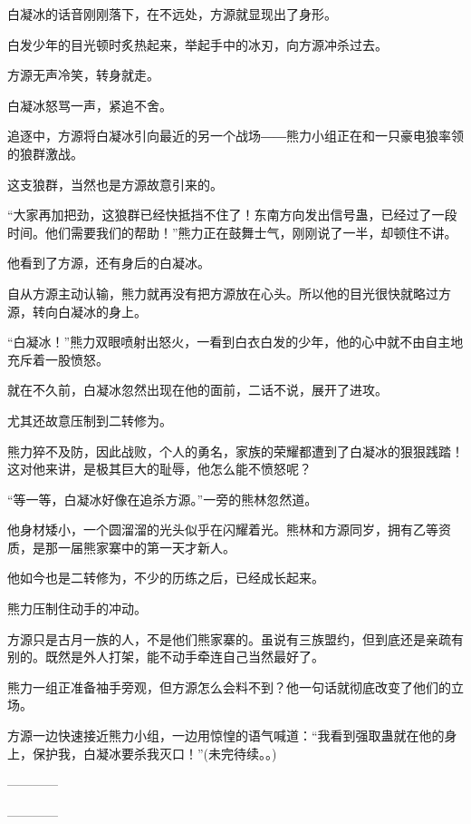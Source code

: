 \begin{this_body}
白凝冰的话音刚刚落下，在不远处，方源就显现出了身形。

白发少年的目光顿时炙热起来，举起手中的冰刃，向方源冲杀过去。

方源无声冷笑，转身就走。

白凝冰怒骂一声，紧追不舍。

追逐中，方源将白凝冰引向最近的另一个战场――熊力小组正在和一只豪电狼率领的狼群激战。

这支狼群，当然也是方源故意引来的。

“大家再加把劲，这狼群已经快抵挡不住了！东南方向发出信号蛊，已经过了一段时间。他们需要我们的帮助！”熊力正在鼓舞士气，刚刚说了一半，却顿住不讲。

他看到了方源，还有身后的白凝冰。

自从方源主动认输，熊力就再没有把方源放在心头。所以他的目光很快就略过方源，转向白凝冰的身上。

“白凝冰！”熊力双眼喷射出怒火，一看到白衣白发的少年，他的心中就不由自主地充斥着一股愤怒。

就在不久前，白凝冰忽然出现在他的面前，二话不说，展开了进攻。

尤其还故意压制到二转修为。

熊力猝不及防，因此战败，个人的勇名，家族的荣耀都遭到了白凝冰的狠狠践踏！这对他来讲，是极其巨大的耻辱，他怎么能不愤怒呢？

“等一等，白凝冰好像在追杀方源。”一旁的熊林忽然道。

他身材矮小，一个圆溜溜的光头似乎在闪耀着光。熊林和方源同岁，拥有乙等资质，是那一届熊家寨中的第一天才新人。

他如今也是二转修为，不少的历练之后，已经成长起来。

熊力压制住动手的冲动。

方源只是古月一族的人，不是他们熊家寨的。虽说有三族盟约，但到底还是亲疏有别的。既然是外人打架，能不动手牵连自己当然最好了。

熊力一组正准备袖手旁观，但方源怎么会料不到？他一句话就彻底改变了他们的立场。

方源一边快速接近熊力小组，一边用惊惶的语气喊道：“我看到强取蛊就在他的身上，保护我，白凝冰要杀我灭口！”(未完待续。。)

------------

------------

\end{this_body}

